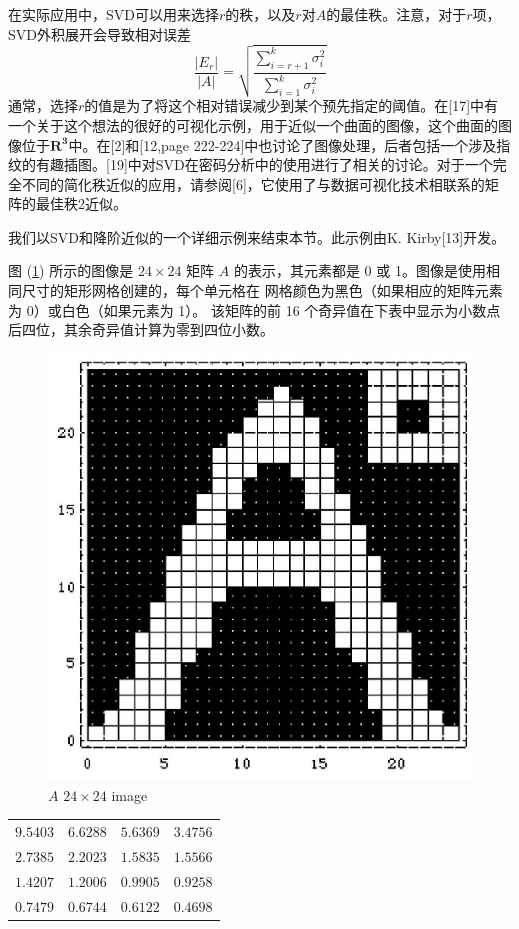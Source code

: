\documentclass[11pt,a4paper,twoside]{article}
\begin{document}
\begin{CJK}{UTF8}{gbsn}
在实际应用中，SVD可以用来选择$r$的秩，以及$r$对$A$的最佳秩。注意，对于$r$项，SVD外积展开会导致相对误差
$$
\frac{\left|E_{r}\right|}{|A|}=\sqrt{\frac{\sum_{i=r+1}^{k} \sigma_{i}^{2}}{\sum_{i=1}^{k} \sigma_{i}^{2}}}
$$
通常，选择$r$的值是为了将这个相对错误减少到某个预先指定的阈值。在[17]中有一个关于这个想法的很好的可视化示例，用于近似一个曲面的图像，这个曲面的图像位于$\mathbf{R}^{\mathbf{3}}$中。在[2]和[12,page 222-224]中也讨论了图像处理，后者包括一个涉及指纹的有趣插图。[19]中对SVD在密码分析中的使用进行了相关的讨论。对于一个完全不同的简化秩近似的应用，请参阅[6]，它使用了与数据可视化技术相联系的矩阵的最佳秩2近似。

我们以SVD和降阶近似的一个详细示例来结束本节。此示例由K. Kirby[13]开发。

图 (\ref{fig:6}) 所示的图像是 $24\times 24$ 矩阵 $A$ 的表示，其元素都是 0 或 1。图像是使用相同尺寸的矩形网格创建的，每个单元格在 网格颜色为黑色（如果相应的矩阵元素为 0）或白色（如果元素为 1）。 该矩阵的前 16 个奇异值在下表中显示为小数点后四位，其余奇异值计算为零到四位小数。
\begin{figure}[htbp]%
  \centering
  \includegraphics[totalheight=2in]{./fig/6.jpg}
  \caption{$A$ $24 \times 24$ image} 
  \label{fig:6}
\end{figure}

\begin{center}
\begin{tabular}{|llll|}
\hline
$9.5403$ & $6.6288$ & $5.6369$ & $3.4756$ \\
$2.7385$ & $2.2023$ & $1.5835$ & $1.5566$ \\
$1.4207$ & $1.2006$ & $0.9905$ & $0.9258$ \\
$0.7479$ & $0.6744$ & $0.6122$ & $0.4698$ \\
\hline
\end{tabular}
\end{center}


\end{CJK}
\end{document}
